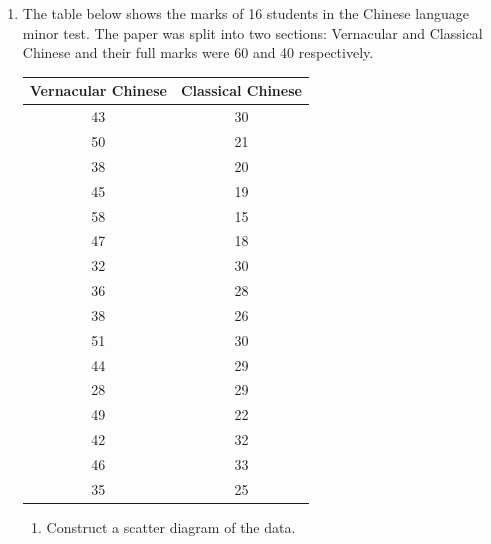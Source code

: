 \documentclass{report}
\begin{document}
\begin{multicols}{2}
\begin{enumerate}
    \item The table below shows the marks of 16 students in the Chinese language minor
          test. The paper was split into two sections: Vernacular and Classical Chinese
          and their full marks were 60 and 40 respectively.
          \begin{center}
            \begin{tabular}{|c|c|}
              \hline
              Vernacular Chinese & Classical Chinese \\
              \hline
              43                 & 30                \\
              50                 & 21                \\
              38                 & 20                \\
              45                 & 19                \\
              58                 & 15                \\
              47                 & 18                \\
              32                 & 30                \\
              36                 & 28                \\
              38                 & 26                \\
              51                 & 30                \\
              44                 & 29                \\
              28                 & 29                \\
              49                 & 22                \\
              42                 & 32                \\
              46                 & 33                \\
              35                 & 25                \\
              \hline
            \end{tabular}
          \end{center}
          \begin{enumerate}
            \item Construct a scatter diagram of the data. \sol{}
                  \begin{center}
                    \resizebox{\columnwidth-4.6em}{!}{
                      \begin{tikzpicture}

\end{tikzpicture}}
\end{center}
\end{enumerate}
\end{enumerate}
\end{multicols}
\end{document}
